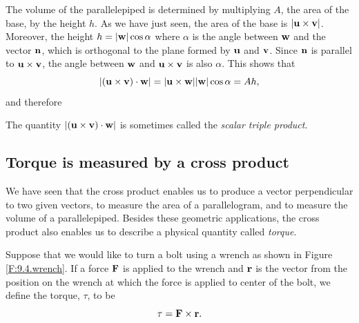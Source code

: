 The volume of the parallelepiped is determined by multiplying $A$, the
area of the base, by the height $h$.  As we have just seen, the area
of the base is $|\mathbf{u}\times\mathbf{v}|$.  Moreover, the height
$h=|\mathbf{w}|\cos\alpha$ where $\alpha$ is the angle between $\mathbf{w}$ and the
vector $\mathbf{n}$, which is orthogonal to the plane formed by $\mathbf{u}$ and
$\mathbf{v}$.  Since $\mathbf{n}$ is parallel to $\mathbf{u}\times\mathbf{v}$, the angle between
$\mathbf{w}$ and $\mathbf{u}\times\mathbf{v}$ is also $\alpha$.  This shows that
$$
|(\mathbf{u}\times\mathbf{v})\cdot\mathbf{w}| = |\mathbf{u}\times\mathbf{w}||\mathbf{w}|\cos\alpha = Ah,
$$
and therefore 

\vspace*{5pt}
\nin {}
\vspace*{5pt}

The quantity $|(\mathbf{u} \times
  \mathbf{v}) \cdot \mathbf{w}|$ is sometimes called the \emph{scalar triple product}.
  
  \bigskip
  


\subsection*{Torque is measured by a cross product}

We have seen that the cross product enables us to produce a vector
perpendicular to two given vectors, to measure the area of a
parallelogram, and to measure the volume of a parallelepiped.  Besides
these geometric applications, the cross product also enables us to
describe a physical quantity called {\em torque}.

Suppose that we would like to turn a bolt using a wrench as shown
in Figure \ref{F:9.4.wrench}.  If a force $\mathbf{F}$ is applied to the
wrench and $\mathbf{r}$ is the vector from the position on the wrench at which the force is applied to center of the bolt, we define the
torque, $\tau$, to be
$$
\tau=\mathbf{F}\times\mathbf{r}.
$$

